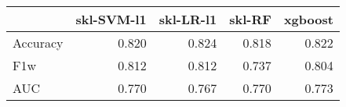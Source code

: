 \begin{tabular}{lrrrr}
\toprule
{} &  skl-SVM-l1 &  skl-LR-l1 &  skl-RF &  xgboost \\
\midrule
Accuracy &       0.820 &      0.824 &   0.818 &    0.822 \\
F1w      &       0.812 &      0.812 &   0.737 &    0.804 \\
AUC      &       0.770 &      0.767 &   0.770 &    0.773 \\
\bottomrule
\end{tabular}
